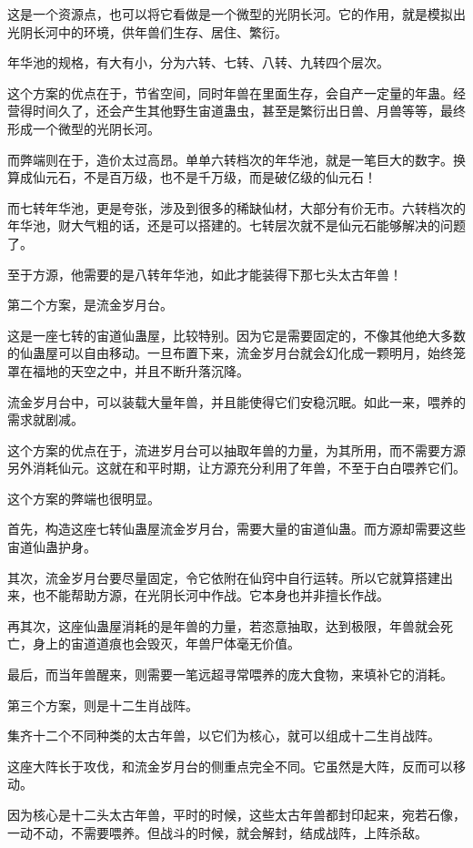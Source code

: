 \begin{this_body}
这是一个资源点，也可以将它看做是一个微型的光阴长河。它的作用，就是模拟出光阴长河中的环境，供年兽们生存、居住、繁衍。

年华池的规格，有大有小，分为六转、七转、八转、九转四个层次。

这个方案的优点在于，节省空间，同时年兽在里面生存，会自产一定量的年蛊。经营得时间久了，还会产生其他野生宙道蛊虫，甚至是繁衍出日兽、月兽等等，最终形成一个微型的光阴长河。

而弊端则在于，造价太过高昂。单单六转档次的年华池，就是一笔巨大的数字。换算成仙元石，不是百万级，也不是千万级，而是破亿级的仙元石！

而七转年华池，更是夸张，涉及到很多的稀缺仙材，大部分有价无市。六转档次的年华池，财大气粗的话，还是可以搭建的。七转层次就不是仙元石能够解决的问题了。

至于方源，他需要的是八转年华池，如此才能装得下那七头太古年兽！

第二个方案，是流金岁月台。

这是一座七转的宙道仙蛊屋，比较特别。因为它是需要固定的，不像其他绝大多数的仙蛊屋可以自由移动。一旦布置下来，流金岁月台就会幻化成一颗明月，始终笼罩在福地的天空之中，并且不断升落沉降。

流金岁月台中，可以装载大量年兽，并且能使得它们安稳沉眠。如此一来，喂养的需求就剧减。

这个方案的优点在于，流进岁月台可以抽取年兽的力量，为其所用，而不需要方源另外消耗仙元。这就在和平时期，让方源充分利用了年兽，不至于白白喂养它们。

这个方案的弊端也很明显。

首先，构造这座七转仙蛊屋流金岁月台，需要大量的宙道仙蛊。而方源却需要这些宙道仙蛊护身。

其次，流金岁月台要尽量固定，令它依附在仙窍中自行运转。所以它就算搭建出来，也不能帮助方源，在光阴长河中作战。它本身也并非擅长作战。

再其次，这座仙蛊屋消耗的是年兽的力量，若恣意抽取，达到极限，年兽就会死亡，身上的宙道道痕也会毁灭，年兽尸体毫无价值。

最后，而当年兽醒来，则需要一笔远超寻常喂养的庞大食物，来填补它的消耗。

第三个方案，则是十二生肖战阵。

集齐十二个不同种类的太古年兽，以它们为核心，就可以组成十二生肖战阵。

这座大阵长于攻伐，和流金岁月台的侧重点完全不同。它虽然是大阵，反而可以移动。

因为核心是十二头太古年兽，平时的时候，这些太古年兽都封印起来，宛若石像，一动不动，不需要喂养。但战斗的时候，就会解封，结成战阵，上阵杀敌。


\end{this_body}
